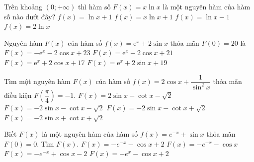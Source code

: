\begin{ex}%
 Trên khoảng $(0;+\infty)$ thì hàm số $F(x)=x \ln x$ là một nguyên hàm của hàm số nào dưới đây?
 \choice
 {\True $f(x)=\ln x+1$}
 {$f(x)=x \ln x+1$}
 {$f(x)=\ln x-1$}
 {$f(x)=2 \ln x$}
\end{ex}
\begin{ex}
 Nguyên hàm $F(x)$ của hàm số $f(x) = \mathrm{e}^x + 2\sin x$ thỏa mãn $F(0) = 20$ là
 \choice
 {$F(x) = -\mathrm{e}^x - 2\cos x + 23$}
 {\True $F(x) = \mathrm{e}^x - 2\cos x + 21$}
 {$F(x) = \mathrm{e}^x + 2\cos x + 17$}
 {$F(x) = \mathrm{e}^x + 2\sin x + 19$}
\end{ex}
\begin{ex}%
 Tìm một nguyên hàm $F(x)$ của hàm số $f(x)=2\cos x + \dfrac{1}{\sin^2 x}$ thỏa mãn điều kiện $F\left(\dfrac{\pi}{4}\right)=-1$.
 \choice
 {\True $F(x)=2\sin x - \cot x - \sqrt{2}$}
 {$F(x)=-2\sin x - \cot x - \sqrt{2}$}
 {$F(x)=-2\sin x - \cot x + \sqrt{2}$}
 {$F(x)=-2\sin x + \cot x + \sqrt{2}$}
\end{ex}
\begin{ex}%
 Biết $F(x)$ là một nguyên hàm của hàm số $f(x)=e^{-x} + \sin x$ thỏa mãn $F(0)=0$. Tìm $F(x)$.
 \choice
 {\True $F(x)=-e^{-x} - \cos x + 2$}
 {$F(x)=-e^{-x} - \cos x$}
 {$F(x)=-e^{-x} + \cos x - 2$}
 {$F(x)=-e^{x} - \cos x + 2$}
\end{ex}
